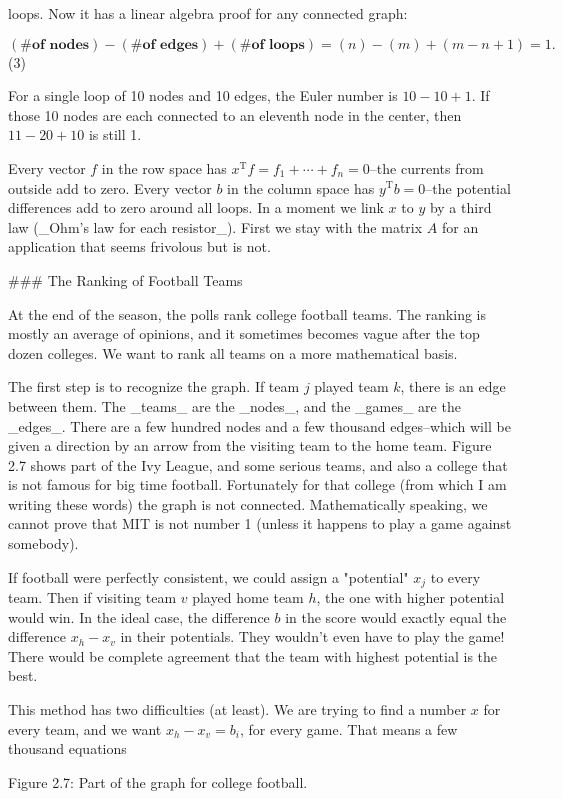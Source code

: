 loops. Now it has a linear algebra proof for any connected graph:

\[(\textbf{\# of nodes})-(\textbf{\# of edges})+(\textbf{\# of loops})=(n)-(m)+(m-n+1)=1.\] (3)

For a single loop of 10 nodes and 10 edges, the Euler number is \(10-10+1\). If those 10 nodes are each connected to an eleventh node in the center, then \(11-20+10\) is still 1.

Every vector \(f\) in the row space has \(x^{\mathrm{T}}f=f_{1}+\cdots+f_{n}=0\)--the currents from outside add to zero. Every vector \(b\) in the column space has \(y^{\mathrm{T}}b=0\)--the potential differences add to zero around all loops. In a moment we link \(x\) to \(y\) by a third law (_Ohm's law for each resistor_). First we stay with the matrix \(A\) for an application that seems frivolous but is not.

### The Ranking of Football Teams

At the end of the season, the polls rank college football teams. The ranking is mostly an average of opinions, and it sometimes becomes vague after the top dozen colleges. We want to rank all teams on a more mathematical basis.

The first step is to recognize the graph. If team \(j\) played team \(k\), there is an edge between them. The _teams_ are the _nodes_, and the _games_ are the _edges_. There are a few hundred nodes and a few thousand edges--which will be given a direction by an arrow from the visiting team to the home team. Figure 2.7 shows part of the Ivy League, and some serious teams, and also a college that is not famous for big time football. Fortunately for that college (from which I am writing these words) the graph is not connected. Mathematically speaking, we cannot prove that MIT is not number 1 (unless it happens to play a game against somebody).

If football were perfectly consistent, we could assign a "potential" \(x_{j}\) to every team. Then if visiting team \(v\) played home team \(h\), the one with higher potential would win. In the ideal case, the difference \(b\) in the score would exactly equal the difference \(x_{h}-x_{v}\) in their potentials. They wouldn't even have to play the game! There would be complete agreement that the team with highest potential is the best.

This method has two difficulties (at least). We are trying to find a number \(x\) for every team, and we want \(x_{h}-x_{v}=b_{i}\), for every game. That means a few thousand equations

Figure 2.7: Part of the graph for college football.

 